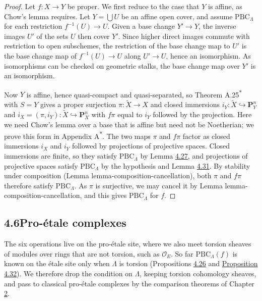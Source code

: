 \documentclass[11pt]{article}
\newcommand{\bpout}[1]{#1\textsuperscript{\hyperlink{bp-outside}{\ensuremath{\ast}}}}
\begin{document}
\begin{proof}[{Proof}]\label{bp379}%
Let \(f:X\to Y\) be proper. We first reduce to the case that \(Y\) is affine, as Chow's lemma requires. Let \(Y=\bigcup U\) be an affine open cover, and assume \(\mathrm{PBC}_\Lambda\) for each restriction \(f^{-1}(U)\to U\). Given a base change \(Y'\to Y\), the inverse images \(U'\) of the sets \(U\) then cover \(Y'\). Since higher direct images commute with restriction to open subschemes, the restriction of the base change map to \(U'\) is the base change map of \(f^{-1}(U)\to U\) along \(U'\to U\), hence an isomorphism. As isomorphisms can be checked on geometric stalks, the base change map over \(Y'\) is an isomorphism.

Now \(Y\) is affine, hence quasi-compact and quasi-separated, so Theorem \bpout{A.25} with \(S=Y\) gives a proper surjection \(\pi:\widetilde X\to X\) and closed immersions \(i_Y:\widetilde X\hookrightarrow\mathbf P^n_Y\) and \(i_X=(\pi,i_Y):\widetilde X\hookrightarrow\mathbf P^n_X\) with \(f\pi\) equal to \(i_Y\) followed by the projection. Here we need Chow's lemma over a base that is affine but need not be Noetherian; we prove this form in Appendix \bpout{A}. The two maps \(\pi\) and \(f\pi\) factor as closed immersions \(i_X\) and \(i_Y\) followed by projections of projective spaces. Closed immersions are finite, so they satisfy \(\mathrm{PBC}_\Lambda\) by Lemma \hyperref[bp364]{4.27}, and projections of projective spaces satisfy \(\mathrm{PBC}_\Lambda\) by the hypothesis and Lemma \hyperref[bp375]{4.31}. By stability under composition (Lemma lemma-composition-cancellation), both \(\pi\) and \(f\pi\) therefore satisfy \(\mathrm{PBC}_\Lambda\). As \(\pi\) is surjective, we may cancel it by Lemma lemma-composition-cancellation, and this gives \(\mathrm{PBC}_\Lambda\) for \(f\).
\end{proof}


\subsection*{\texorpdfstring{4.6\quad Pro-étale complexes}{4.6 Pro-étale complexes}}
\label{bp380}%
\label{bp381}%
The six operations live on the pro-étale site, where we also meet torsion sheaves of modules over rings that are not torsion, such as \(\mathcal O_E\). So far \(\mathrm{PBC}_\Lambda(f)\) is known on the étale site only when \(\Lambda\) is torsion (Propositions \hyperref[bp360]{4.26} and \hyperref[bp378]{Proposition 4.32}). We therefore drop the condition on \(\Lambda\), keeping torsion cohomology sheaves, and pass to classical pro-étale complexes by the comparison theorems of Chapter \hyperref[bp3]{2}.
\end{document}
